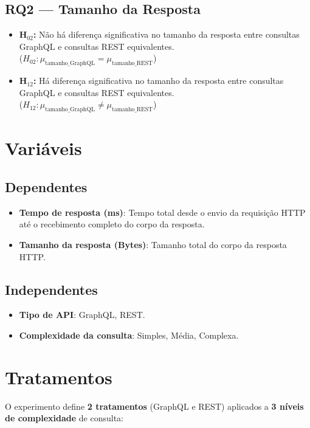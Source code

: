 \documentclass[12pt, a4paper]{article}
\begin{document}
\subsection{RQ2 — Tamanho da Resposta}
\begin{itemize}
    \item \textbf{H$_{02}$:} Não há diferença significativa no tamanho da resposta entre consultas GraphQL e consultas REST equivalentes.\\
    ($H_{02}: \mu_{\text{tamanho\_GraphQL}} = \mu_{\text{tamanho\_REST}}$)
    \item \textbf{H$_{12}$:} Há diferença significativa no tamanho da resposta entre consultas GraphQL e consultas REST equivalentes.\\
    ($H_{12}: \mu_{\text{tamanho\_GraphQL}} \neq \mu_{\text{tamanho\_REST}}$)
\end{itemize}

\section{Variáveis}

\subsection{Dependentes}
\begin{itemize}
    \item \textbf{Tempo de resposta (ms)}: Tempo total desde o envio da requisição HTTP até o recebimento completo do corpo da resposta.
    \item \textbf{Tamanho da resposta (Bytes)}: Tamanho total do corpo da resposta HTTP.
\end{itemize}

\subsection{Independentes}
\begin{itemize}
    \item \textbf{Tipo de API}: GraphQL, REST.
    \item \textbf{Complexidade da consulta}: Simples, Média, Complexa.
\end{itemize}

\section{Tratamentos}

O experimento define \textbf{2 tratamentos} (GraphQL e REST) aplicados a \textbf{3 níveis de complexidade} de consulta:
\end{document}
